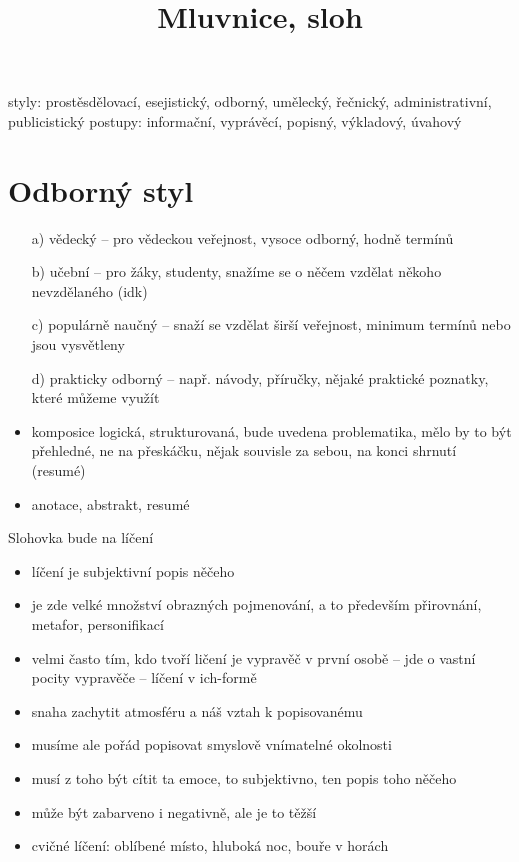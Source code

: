 \documentclass{article}
\title{\vspace{-2cm}Mluvnice, sloh\vspace{-1.7cm}}
\date{}
\author{}
\begin{document}
\maketitle
styly: prostěsdělovací, esejistický, odborný, umělecký, řečnický, administrativní, publicistický
postupy: informační, vyprávěcí, popisný, výkladový, úvahový

\part{Odborný styl}
\begin{itemize}
  \item[a)] vědecký -- pro vědeckou veřejnost, vysoce odborný, hodně termínů
  \item[b)] učební -- pro žáky, studenty, snažíme se o něčem vzdělat někoho nevzdělaného (idk)
  \item[c)] populárně naučný -- snaží se vzdělat širší veřejnost, minimum termínů nebo jsou vysvětleny
  \item[d)] prakticky odborný -- např. návody, příručky, nějaké praktické poznatky, které můžeme využít
\end{itemize}
\begin{itemize}
  \item komposice logická, strukturovaná, bude uvedena problematika, mělo by to být přehledné, ne na přeskáčku, nějak souvisle za sebou, na konci shrnutí (resumé)
  \item anotace, abstrakt, resumé
\end{itemize}

Slohovka bude na líčení
\begin{itemize}
  \item líčení je subjektivní popis něčeho
  \item je zde velké množství obrazných pojmenování, a to především přirovnání, metafor, personifikací
  \item velmi často tím, kdo tvoří ličení je vypravěč v první osobě -- jde o vastní pocity vypravěče -- líčení v ich-formě
  \item snaha zachytit atmosféru a náš vztah k popisovanému
  \item musíme ale pořád popisovat smyslově vnímatelné okolnosti
  \item musí z toho být cítit ta emoce, to subjektivno, ten popis toho něčeho
  \item může být zabarveno i negativně, ale je to těžší
  \item cvičné líčení: oblíbené místo, hluboká noc, bouře v horách
\end{itemize}
\end{document}
